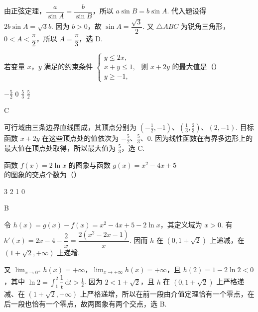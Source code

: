 \begin{solution}
由正弦定理，\(\dfrac{a}{\sin A}=\dfrac{b}{\sin B}\)，所以 \(a\sin B=b\sin A\). 代入题设得 \(2b\sin A=\sqrt{3}b\). 因为 \(b>0\)，故 \(\sin A=\dfrac{\sqrt{3}}{2}\). 又 \(\triangle ABC\) 为锐角三角形，\(0<A<\dfrac{\pi}{2}\)，所以 \(A=\dfrac{\pi}{3}\)，选 D.
\end{solution}

\begin{problem}
若变量 \(x\)，\(y\) 满足的约束条件 \(\begin{cases}
y \leqslant 2x,\\
x + y \leqslant 1,\\
y \geqslant -1,
\end{cases}\) 则 \(x + 2y\) 的最大值是（\quad）

\choices
    {\(-\frac{5}{2}\)}
    {0}
    {\( \frac{5}{3} \)}
    {\( \frac{5}{2} \)}
\end{problem}

\begin{answer}
C
\end{answer}

\begin{solution}
可行域由三条边界直线围成，其顶点分别为
\((-\frac{1}{2},-1)\)、\((\frac{1}{3},\frac{2}{3})\)、\((2,-1)\). 目标函数 \(x+2y\) 在这些顶点处的值依次为
\(-\frac{5}{2}\)、\(\frac{5}{3}\)、\(0\). 因为线性函数在有界多边形上的最大值在顶点处取得，所以最大值为 \(\frac{5}{3}\)，选 C.
\end{solution}

\begin{problem}
函数 \( f(x) = 2\ln x \) 的图象与函数 \( g(x) = x^2 - 4x + 5 \) 的图象的交点个数为（\quad）

\choices
    {3}
    {2}
    {1}
    {0}
\end{problem}

\begin{answer}
B
\end{answer}

\begin{solution}
令
\(h(x)=g(x)-f(x)=x^{2}-4x+5-2\ln x\)，其定义域为 \(x>0\). 有
\(h'(x)=2x-4-\dfrac{2}{x}=\dfrac{2(x^{2}-2x-1)}{x}\). 因而 \(h\) 在 \((0,1+\sqrt{2})\) 上递减，在 \((1+\sqrt{2},+\infty)\) 上递增.

又 \(\lim_{x\to0^{+}}h(x)=+\infty\)，\(\lim_{x\to+\infty}h(x)=+\infty\)，且
\(h(2)=1-2\ln2<0\)，其中 \(\ln2=\int_{1}^{2}\dfrac{1}{t}\,\mathrm{d}t>\frac{1}{2}\). 因为 \(2<1+\sqrt{2}\)，且 \(h\) 在 \((0,1+\sqrt{2})\) 上严格递减、在 \((1+\sqrt{2},+\infty)\) 上严格递增，所以在前一段由介值定理恰有一个零点，在后一段也恰有一个零点，故两图象有两个交点，选 B.
\end{solution}

